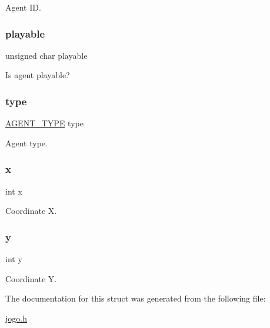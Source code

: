 Agent ID. \mbox{\label{struct_a_g_e_n_t_a63b583a476b62c88c27c5cfc6ee64e41}} 
\subsubsection{\texorpdfstring{playable}{playable}}
{\footnotesize\ttfamily unsigned char playable}

Is agent playable? \mbox{\label{struct_a_g_e_n_t_aa67ea80f7f0c5d71eaa7fe3ce7d31cc9}} 
\subsubsection{\texorpdfstring{type}{type}}
{\footnotesize\ttfamily \mbox{\hyperlink{showworld_8h_a24d5ee52bdf31f4727c9b550d6e361ae}{A\+G\+E\+N\+T\+\_\+\+T\+Y\+PE}} type}

Agent type. \mbox{\label{struct_a_g_e_n_t_a6150e0515f7202e2fb518f7206ed97dc}} 
\subsubsection{\texorpdfstring{x}{x}}
{\footnotesize\ttfamily int x}

Coordinate X. \mbox{\label{struct_a_g_e_n_t_a0a2f84ed7838f07779ae24c5a9086d33}} 
\subsubsection{\texorpdfstring{y}{y}}
{\footnotesize\ttfamily int y}

Coordinate Y. 

The documentation for this struct was generated from the following file\+:\begin{DoxyCompactItemize}
\item 
\mbox{\hyperlink{jogo_8h}{jogo.\+h}}\end{DoxyCompactItemize}
